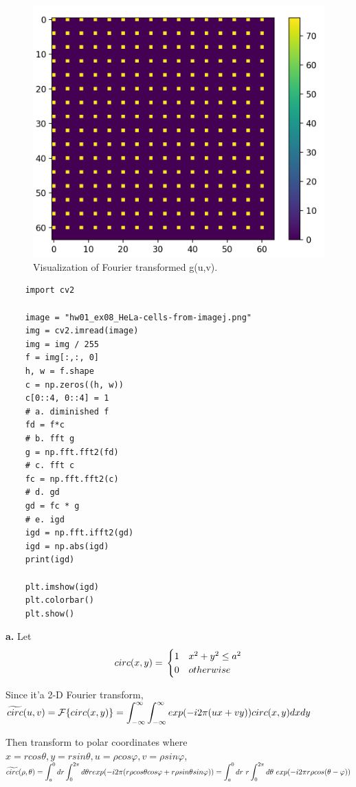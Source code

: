 \documentclass[11pt,a4paper]{article}
\begin{document}
\begin{figure}[!htp]
    \centering
    \includegraphics[width=0.6\linewidth]{HW2_Q5_5.2.png}
    \caption{Visualization of Fourier transformed g(u,v).}
    \label{fig:ifftgd}
\end{figure}

\begin{lstlisting}
    import cv2
    
    image = "hw01_ex08_HeLa-cells-from-imagej.png"
    img = cv2.imread(image)
    img = img / 255
    f = img[:,:, 0]
    h, w = f.shape
    c = np.zeros((h, w))
    c[0::4, 0::4] = 1
    # a. diminished f
    fd = f*c
    # b. fft g
    g = np.fft.fft2(fd)
    # c. fft c
    fc = np.fft.fft2(c)
    # d. gd
    gd = fc * g
    # e. igd
    igd = np.fft.ifft2(gd)
    igd = np.abs(igd)
    print(igd)
    
    plt.imshow(igd)
    plt.colorbar()
    plt.show()
\end{lstlisting}


\newpage
{}
\textbf{a.} 
Let 
\begin{equation}
    circ(x, y) = \\
    \begin{cases}
        1 & x^2+y^2\le a^2\\
        0 & otherwise \\
    \end{cases}
\end{equation}

Since it'a 2-D Fourier transform, \\
$\widetilde{circ}(u, v)=\mathcal{F}\{circ(x, y)\}
=\infint\infint exp(-i2\pi (ux+vy))circ(x, y)dxdy$

Then transform to polar coordinates where \\ 
$x=rcos\theta,y=rsin\theta,u=\rho cos\varphi,v=\rho sin\varphi$,\\
$\widetilde{circ}(\rho, \theta)=\bint{a}{0}dr\bint{0}{2\pi}d\theta r exp(-i2\pi(r\rho cos\theta cos\varphi+ r\rho sin\theta sin \varphi))\\
=\bint{a}{0}dr\ r\bint{0}{2\pi}d\theta\ exp(-i2\pi r\rho cos(\theta-\varphi))$
\end{document}
